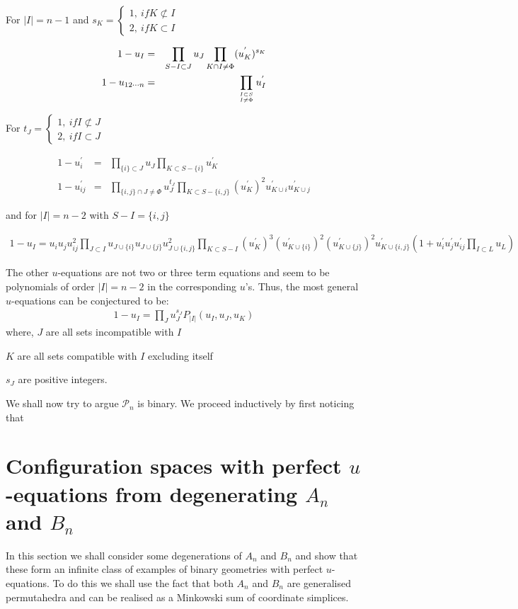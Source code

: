 \documentclass[hidelinks,12pt]{article}
\newcommand{\bea}[1]{\begin{eqnarray}\label{#1} }
\newcommand{\eea}{\end{eqnarray}}
\def\bea{\begin{eqnarray}}
\def\eea{\end{eqnarray}}
\begin{document}
\begin{enumerate}
For $|I| =n-1$ and $s_K = \begin{cases}  1,~ if K \not\subset I & \\ 2, ~if K \subset I\end{cases}$

\bea
1-u_{I} &=& \prod_ {S - I \subset J } u_{J} \prod_ {K \cap I \ne \Phi } (u^{'}_{K})^{s_K}  \nonumber \\
1-u_{12\cdots n} &=& \prod_ {{I \subset S}\atop {I \ne \Phi}} u^{'}_{I} \nonumber
\eea

For $t_J = \begin{cases}  1,~ if I  \not\subset J & \\ 2, ~if I \subset J \end{cases}$

\bea
1-u^{'}_{i} &=& \prod_ {\{ i \} \subset J } u_{J} \prod_ {K \subset S- \{i\} } u^{'}_{K} \nonumber \\
1-u^{'}_{i j} &=& \prod_ {\{i,j \}\cap J \ne \Phi} u^{t_J}_{J} \prod_ {K \subset S-\{i, j \} } (u^{'}_{K})^{2} u^{'}_{K \cup {i}} u^{'}_{K \cup{j} } \nonumber 
\eea

and for $|I| =n-2$ with $S- I = \{i, j\}$

\bea
1-u_{I}= u_i u_j u^{2}_{ij} \prod_{J \subset I} u_{J \cup \{i\}} u_{J \cup \{j\}} u^{2}_{J \cup \{i,j\}} \prod_{K \subset S-I} (u^{'}_K)^{3} (u^{'}_{K \cup \{i\}})^{2}  (u^{'}_{K \cup\{j\}})^{2}  u^{'}_{K\cup \{i,j\}} \left( 1+ u^{'}_i u^{'}_j u^{'}_{ij} \prod_{I \subset L} u_L \right)                       \nonumber
\eea
   
The other $u$-equations are not two or three term equations and seem to be polynomials of order $|I|=n-2$ in the corresponding $u$'s. Thus, the most general $u$-equations can be conjectured to be:
\bea
1-u_{I} = \prod_{J} u^{s_J}_{J} P_{|I|}(u_I, u_J,u_K) 
\eea
where, $J$ are all sets incompatible with $I$

 $K$ are all sets compatible with $I$ excluding itself 
 
  $s_J$ are positive integers. 
\end{enumerate}
We shall now try to argue ${\mathscr P_n}$ is binary. We proceed inductively by first noticing that 
\section{Configuration spaces with perfect $u$-equations from degenerating $A_n$ and $B_n$}
In this section we shall consider some degenerations of $A_n$ and $B_n$ and show that these form an infinite class of examples of binary geometries with perfect $u$-equations. To do this we shall use the fact that both $A_n$ and $B_n$ are generalised permutahedra and can be realised as a Minkowski sum of coordinate simplices. 
\end{document}
